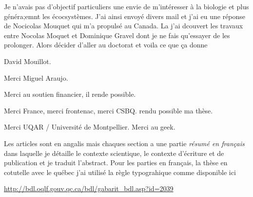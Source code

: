 
\avantpropos
{}
%

Je n'avais pas d'objectif particuliers une envie de m'intéresser à la biologie et plus généra;emnt les écocsystèmes. J'ai ainsi envoyé divers mail et j'ai eu une réponse de Nocicolas Mouquet qui m'a propulsé au Canada. La j'ai dcouvert les travaux entre Nocolas Moquet et Dominique Gravel dont je ne fais qu'essayer de les prolonger. Alors décider d'aller au doctorat et voila ce que ça donne

David Mouillot.

Merci Miguel Araujo.

Merci au soutien financier, il rende possible.

Merci France, merci frontenac, merci CSBQ. rendu possible ma thèse.

Merci UQAR / Université de Montpellier.
Merci au geek.


Les articles sont en angalis mais chaques section a une partie \emph{résumé en français} dans laquelle je détaille le contexte scientique, le contexte d'écriture et de publication et je traduit l'abstract.
Pour les parties en français, la thèse en cotutelle avec le québec j'ai utilisé la règle typograhique comme disponible ici

\url{http://bdl.oqlf.gouv.qc.ca/bdl/gabarit_bdl.asp?id=2039}


